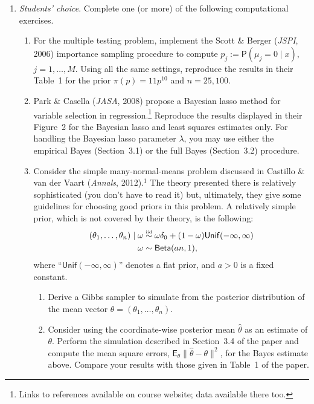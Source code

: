\documentclass[a4paper,12pt]{article}
\newcommand{\E}{\mathsf{E}}
\newcommand{\prob}{\mathsf{P}}
\newcommand{\iid}{\overset{\text{\tiny iid}}{\sim}}
\newcommand{\unif}{\mathsf{Unif}}
\begin{document}
\begin{enumerate}
\item \emph{Students' choice}.  Complete one (or more) of the following computational exercises.
\begin{enumerate}
\item For the multiple testing problem, implement the Scott \& Berger (\emph{JSPI}, 2006) importance sampling procedure to compute $p_j := \prob(\mu_j = 0 \mid x)$, $j=1,\ldots,M$.  Using all the same settings, reproduce the results in their Table~1 for the prior $\pi(p)=11p^{10}$ and $n=25, 100$.  
\item Park \& Casella (\emph{JASA}, 2008) propose a Bayesian lasso method for variable selection in regression.\footnote{Links to references available on course website; data available there too.}  Reproduce the results displayed in their Figure~2 for the Bayesian lasso and least squares estimates only.  For handling the Bayesian lasso parameter $\lambda$, you may use either the empirical Bayes (Section~3.1) or the full Bayes (Section~3.2) procedure.  
\item Consider the simple many-normal-means problem discussed in Castillo \& van der Vaart (\emph{Annals}, 2012).$^1$  The theory presented there is relatively sophisticated (you don't have to read it) but, ultimately, they give some guidelines for choosing good priors in this problem.  A relatively simple prior, which is not covered by their theory, is the following: 
\begin{align*}
(\theta_1,\ldots,\theta_n) \mid \omega & \iid \omega \delta_0 + (1-\omega) \unif(-\infty,\infty) \\
\omega & \sim {\sf Beta}(an, 1), 
\end{align*}
where ``$\unif(-\infty,\infty)$'' denotes a flat prior, and $a > 0$ is a fixed constant.  
\begin{enumerate}
\item Derive a Gibbs sampler to simulate from the posterior distribution of the mean vector $\theta=(\theta_1,\ldots,\theta_n)$.
\item Consider using the coordinate-wise posterior mean $\hat\theta$ as an estimate of $\theta$.  Perform the simulation described in Section~3.4 of the paper and compute the mean square errors, $\E_\theta\|\hat\theta-\theta\|^2$, for the Bayes estimate above.  Compare your results with those given in Table~1 of the paper.  
\end{enumerate}
\end{enumerate}

\end{enumerate}
\end{document}
